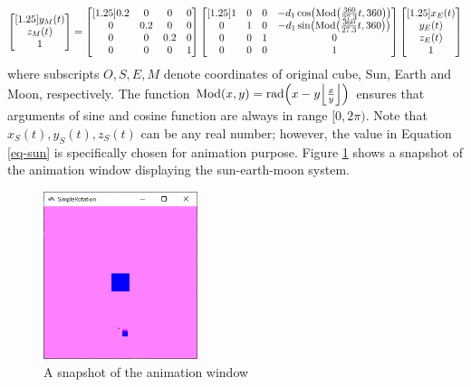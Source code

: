\begin{subequations}
\begin{gather}
\begin{bmatrix}[1.25]
    y_M(t) \\
    z_M(t) \\
    1
    \end{bmatrix} = 
    \begin{bmatrix}[1.25]
    0.2 & 0 & 0 & 0 \\
    0 & 0.2 & 0 & 0 \\
    0 & 0 & 0.2 & 0 \\
    0 & 0 & 0 & 1
    \end{bmatrix} 
    \begin{bmatrix}[1.25]
    1 & 0 & 0 & -d_1\cos\parens*{\text{Mod}\parens*{\frac{360}{27.3}t,360}} \\
    0 & 1 & 0 & -d_1\sin\parens*{\text{Mod}\parens*{\frac{360}{27.3}t,360}} \\
    0 & 0 & 1 & 0 \\
    0 & 0 & 0 & 1
    \end{bmatrix} 
    \begin{bmatrix}[1.25]
    x_E(t) \\
    y_E(t) \\
    z_E(t) \\
    1
    \end{bmatrix}
    \label{eq-moon}
    \end{gather}
\end{subequations}
where subscripts $O, S, E, M$ denote coordinates of original cube, Sun, Earth and Moon, respectively. The function $\text{Mod}(x,y) = \text{rad}\parens*{x - y\floor*{\frac{x}{y}}}$ ensures that arguments of sine and cosine function are always in range $[0,2\pi)$. Note that $x_S(t), y_S(t), z_S(t)$ can be any real number; however, the value in Equation \eqref{eq-sun} is specifically chosen for animation purpose. Figure \ref{cg4-snapshot} shows a snapshot of the animation window displaying the sun-earth-moon system.
\begin{figure}[h]
    \centering
    \includegraphics[width=0.4\textwidth]{figures/assignment4/cg4-snapshot.png}
    \caption{A snapshot of the animation window}
    \label{cg4-snapshot}
\end{figure}

